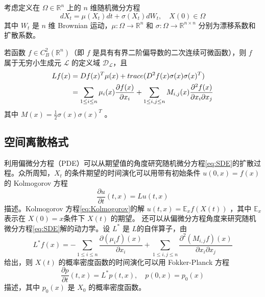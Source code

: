 	\begin{definition}[It\^{o} 扩散的无穷小生成元] \label{thm:infinitesimal-generator-ito}
		
		考虑定义在 $\Omega \in \mathbb{R}^{n}$ 上的 $n$ 维随机微分方程
		\begin{equation} \label{eq:SDE}
			d X_{t}=\mu\left(X_{t}\right) d t+\sigma\left(X_{t}\right) d W_{t}, \quad X(0) \in \Omega 
		\end{equation}	
		其中 $W_{t}$ 是 $n$ 维 Brownian 运动，$\mu: \Omega \rightarrow \mathbb{R}^{n}$ 和 $\sigma: \Omega \rightarrow \mathbb{R}^{n \times n}$ 分别为漂移系数和扩散系数。
		
		若函数 $f \in C^2_B(\mathbb{R}^n)$（即 $f$ 是具有有界二阶偏导数的二次连续可微函数），则 $f$ 属于无穷小生成元 $\mathcal{L}$ 的定义域 $\mathscr{D}_{\mathcal{L}}$，且
		\begin{align} \label{infinitesimal-generator}
			Lf(x) &= Df(x)^T \mu(x) + trace(D^2f(x)\sigma(x)\sigma(x)^T) \notag \\
			&=\sum_{1 \leq i \leq n} \mu_{i}(x) \frac{\partial f(x)}{\partial x_{i}}+\sum_{1 \leq i, j \leq n} M_{i, j}(x) \frac{\partial^{2} f(x)}{\partial x_{i} \partial x_{j}}
		\end{align}
		其中 $M(x)=\frac{1}{2}\sigma(x) \sigma(x)^{T}$ 。
	\end{definition}
	
	\subsection{空间离散格式}
	 利用偏微分方程（PDE）可以从期望值的角度研究随机微分方程\eqref{eq:SDE}的扩散过程。众所周知，$X_{t}$ 的条件期望的时间演化可以用带有初始条件 $u(0, x)=f(x)$ 的 Kolmogorov 方程	
	 \begin{equation} \label{eq:Kolmogorov}
	 \frac{\partial u}{\partial t}(t, x)=L u(t, x) 
	 \end{equation}	
	 描述。Kolmogorov 方程\eqref{eq:Kolmogorov}的解 $u(t, x)=\mathbb{E}_{x} f(X(t))$ ，其中 $\mathbb{E}_{x}$ 表示在 $X(0)=x$条件下 $X(t)$ 的期望。
	 还可以从偏微分方程角度来研究随机微分方程\eqref{eq:SDE}解的动力学。设 $L^{*}$ 是 $L$的自伴算子，由	
	 \begin{equation} \label{adjoint}
	 L^{*} f(x)=-\sum_{1 \leq i \leq n} \frac{\partial\left(\mu_{i} f\right)(x)}{\partial x_{i}}+\sum_{1 \leq i, j \leq n} \frac{\partial^{2}\left(M_{i, j} f\right)(x)}{\partial x_{i} \partial x_{j}} 
	 \end{equation}
	 给出，则 $X(t)$ 的概率密度函数的时间演化可以用 Fokker-Planck 方程
	 \begin{equation}\label{eq:Fokker-Planck}
	 \frac{\partial p}{\partial t}(t, x)=L^{*} p(t, x), \quad p(0, x)=p_{0}(x) 
	 \end{equation}
	 描述，其中 $p_{0}(x)$ 是 $X_{0}$ 的概率密度函数。

